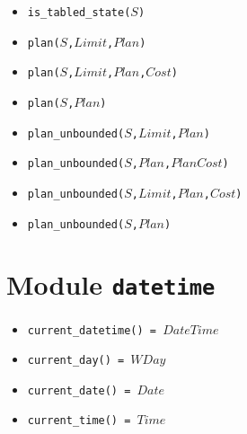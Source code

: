 \documentclass[10pt]{article}
\newcommand{\ignore}[1]{}
\begin{document}
\begin{multicols}{2}
\begin{scriptsize}
\begin{itemize}
\item \texttt{is\_tabled\_state($S$)}
\item \texttt{plan($S$,$Limit$,$Plan$)}
\item \texttt{plan($S$,$Limit$,$Plan$,$Cost$)}
\item \texttt{plan($S$,$Plan$)}
\item \texttt{plan\_unbounded($S$,$Limit$,$Plan$)}
\item \texttt{plan\_unbounded($S$,$Plan$,$PlanCost$)}
\item \texttt{plan\_unbounded($S$,$Limit$,$Plan$,$Cost$)}
\item \texttt{plan\_unbounded($S$,$Plan$)}
\end{itemize}
\end{scriptsize}

\section*{Module \texttt{datetime}}  
\begin{scriptsize}
\begin{itemize}
\item \texttt{current\_datetime() = $DateTime$}
\item \texttt{current\_day() = $WDay$}
\item \texttt{current\_date() = $Date$}
\item \texttt{current\_time() = $Time$}
\end{itemize}
\end{scriptsize}

\ignore{
}
\end{multicols}
\end{document}

